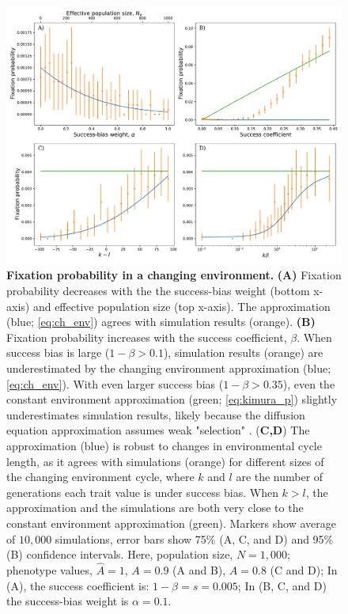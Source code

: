 \documentclass[12pt]{extarticle}
\begin{document}
\begin{figure}[H]
    \includegraphics[width=\linewidth]{../figures/final/ch_env.pdf}
  \caption{\textbf{Fixation probability in a changing environment.}
\textbf{(A)} Fixation probability decreases with the the success-bias weight (bottom x-axis) and effective population size (top x-axis). The approximation (blue; \cref{eq:ch_env}) agrees with simulation results (orange). 
\textbf{(B)} Fixation probability increases with the success coefficient, $\beta$.
When success bias is large ($1-\beta > 0.1$),  
simulation results (orange) are underestimated by the changing environment approximation (blue; \cref{eq:ch_env}). With even larger success bias ($1-\beta > 0.35$), even the constant environment approximation (green; \cref{eq:kimura_p}) slightly underestimates simulation results, likely because the diffusion equation approximation assumes weak "selection" .
(\textbf{C,D}) The approximation (blue) is robust to changes in environmental cycle length, as it agrees with simulations (orange) for different sizes of the changing environment cycle, where $k$ and $l$ are the number of generations each trait value is under success bias. %
When $k>l$, the approximation and the simulations are both very close to the constant environment approximation (green). %
Markers show average of $10,000$ simulations, error bars show 75\% (A, C, and D) and 95\% (B) confidence intervals.
  Here, population size, $N=1,000$; phenotype values, $\hat{A}=1$, $A=0.9$ (A and B), $A=0.8$ (C and D); In (A), the success coefficient is: $1-\beta=s=0.005$; In (B, C, and D) the success-bias weight is $\alpha=0.1$.}
  \label{fig:ch_env_alpha_beta}
\end{figure}
\end{document}

